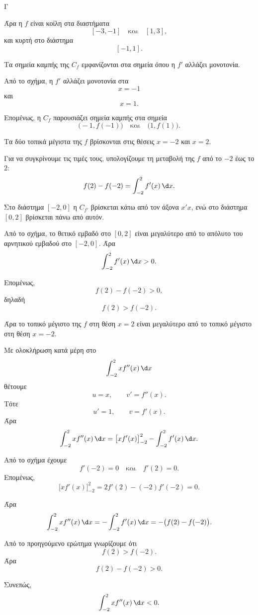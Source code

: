 \begin{thema}{Γ}
\begin{erwthma}
Άρα η $f$ είναι κοίλη στα διαστήματα
\[
[-3,-1]\quad \text{και}\quad [1,3],
\]
και κυρτή στο διάστημα
\[
[-1,1].
\]

\item Τα σημεία καμπής της $C_f$ εμφανίζονται στα σημεία όπου η $f'$ αλλάζει μονοτονία.

Από το σχήμα, η $f'$ αλλάζει μονοτονία στα
\[
x=-1
\]
και
\[
x=1.
\]

Επομένως, η $C_f$ παρουσιάζει σημεία καμπής στα σημεία
\[
\bigl(-1,f(-1)\bigr)
\quad \text{και}\quad
\bigl(1,f(1)\bigr).
\]

\item Τα δύο τοπικά μέγιστα της $f$ βρίσκονται στις θέσεις $x=-2$ και $x=2$.

Για να συγκρίνουμε τις τιμές τους, υπολογίζουμε τη μεταβολή της $f$ από το $-2$ έως το $2$:
\[
f(2)-f(-2)=\int_{-2}^{2} f'(x)\,\d x.
\]

Στο διάστημα $[-2,0]$ η $C_{f'}$ βρίσκεται κάτω από τον άξονα $x'x$, ενώ στο διάστημα $[0,2]$ βρίσκεται πάνω από αυτόν.

Από το σχήμα, το θετικό εμβαδό στο $[0,2]$ είναι μεγαλύτερο από το απόλυτο του αρνητικού εμβαδού στο $[-2,0]$. Άρα
\[
\int_{-2}^{2} f'(x)\,\d x>0.
\]

Επομένως,
\[
f(2)-f(-2)>0,
\]
δηλαδή
\[
f(2)>f(-2).
\]

Άρα το τοπικό μέγιστο της $f$ στη θέση $x=2$ είναι μεγαλύτερο από το τοπικό μέγιστο στη θέση $x=-2$.

\item Με ολοκλήρωση κατά μέρη στο
\[
\int_{-2}^{2} x f''(x)\,\d x
\]
θέτουμε
\[
u=x,\qquad v'=f''(x).
\]
Τότε
\[
u'=1,\qquad v=f'(x).
\]
Άρα
\[
\int_{-2}^{2} x f''(x)\,\d x
=\bigl[x f'(x)\bigr]_{-2}^{2}-\int_{-2}^{2} f'(x)\,\d x.
\]

Από το σχήμα έχουμε
\[
f'(-2)=0
\quad \text{και}\quad
f'(2)=0.
\]
Επομένως,
\[
\bigl[x f'(x)\bigr]_{-2}^{2}=2f'(2)-(-2)f'(-2)=0.
\]

Άρα
\[
\int_{-2}^{2} x f''(x)\,\d x
=-\int_{-2}^{2} f'(x)\,\d x
=-\bigl(f(2)-f(-2)\bigr).
\]

Από το προηγούμενο ερώτημα γνωρίζουμε ότι
\[
f(2)>f(-2).
\]
Άρα
\[
f(2)-f(-2)>0.
\]

Συνεπώς,
\[
\int_{-2}^{2} x f''(x)\,\d x<0.
\]
\end{erwthma}
\end{thema}



